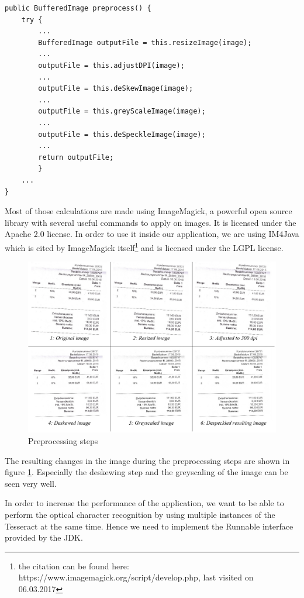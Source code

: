 \begin{lstlisting}[caption={Image preprocessing}]
public BufferedImage preprocess() {
    try {
        ...
        BufferedImage outputFile = this.resizeImage(image);
		...
        outputFile = this.adjustDPI(image);
		...
        outputFile = this.deSkewImage(image);
		...
        outputFile = this.greyScaleImage(image);
		...
        outputFile = this.deSpeckleImage(image);
		...
        return outputFile;
        } 
  	...
}
\end{lstlisting}

Most of those calculations are made using ImageMagick, a powerful open source library with several useful commands to apply on images. It is licensed under the Apache 2.0 license. In order to use it inside our application, we are using IM4Java which is cited by ImageMagick itself\footnote{the citation can be found here: https://www.imagemagick.org/script/develop.php, last visited on 06.03.2017} and is licensed under the LGPL license.

\begin{figure}[htb!]
\centering
\includegraphics[width=\textwidth]{Images/OCR/PreprocessingSteps.jpg}
\caption{Preprocessing steps \label{preprocessingSteps}}
\end{figure}

The resulting changes in the image during the preprocessing steps are shown in figure \ref{preprocessingSteps}.
Especially the deskewing step and the greyscaling of the image can be seen very well.

In order to increase the performance of the application, we want to be able to perform the optical character recognition by using multiple instances of the Tesseract at the same time. Hence we need to implement the Runnable interface provided by the JDK. 

